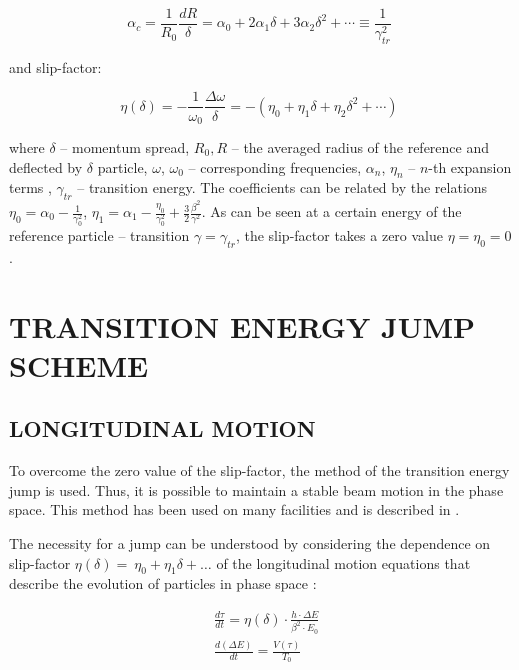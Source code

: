 \documentclass[
aps,%
12pt,%
final,%
notitlepage,%
oneside,%
onecolumn,%
nobibnotes,%
nofootinbib,%
superscriptaddress,%
noshowpacs,%
centertags]%
{revtex4}
\begin{document}
\begin{equation}
\alpha_c=\frac{1}{R_0}\frac{dR}{\delta}=\alpha_0+2\alpha_1\delta+3\alpha_2\delta^2+\cdots\equiv\frac{1}{\gamma_{tr}^2}\ 
\label{eq:mcf}
\end{equation}

and slip-factor:

\begin{equation}
\eta\left(\delta\right)=-\frac{1}{\omega_0}\frac{\Delta\omega}{\delta}=-\left(\eta_0+\eta_1\delta+\eta_2\delta^2+\cdots\right)\ 
\label{eq:slipfactor}
\end{equation}

\par where $\delta$ -- momentum spread, $R_{0}, R$ -- the averaged radius of the reference and deflected by $\delta$ particle, $\omega$, $\omega_{0}$ -- corresponding frequencies, $\alpha_{n}$, $\eta_{n}$ -- $n$-th expansion terms , $\gamma_{tr}$ -- transition energy. The coefficients can be related by the relations $\eta_0=\alpha_0-\frac{1}{\gamma_0^2}$, $\eta_1=\alpha_1-\frac{\eta_0}{\gamma_0^2}+\frac{3}{2}\frac{\beta^2}{\gamma^2}$. As can be seen at a certain energy of the reference particle -- transition $\gamma=\gamma_{tr}$, the slip-factor takes a zero value $\eta=\eta_{0}=0$.

\section{TRANSITION ENERGY JUMP SCHEME}

\subsection{LONGITUDINAL MOTION}
\par To overcome the zero value of the slip-factor, the method of the transition energy jump is used. Thus, it is possible to maintain a stable beam motion in the phase space. This method has been used on many facilities and is described in \cite{jump_scheme, pip}.

\par The necessity for a jump can be understood by considering the dependence on slip-factor $\eta\left(\delta\right)=\ \eta_0+\eta_1\delta+\ldots$ of the longitudinal motion equations that describe the evolution of particles in phase space \cite{Hans}:

\begin{equation}
\begin{aligned}
&\frac{d\tau}{dt}=\eta(\delta)\cdot\frac{h\cdot\Delta E}{\beta^2\cdot E_0}\\
&\frac{d\left(\Delta E\right)}{dt}=\frac{V\left(\tau\right)}{T_0}
\end{aligned}
\label{eq:long}
\end{equation}
\end{document}
